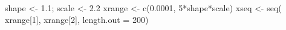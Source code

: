 \begin{Schunk}
\begin{Sinput}
  shape <- 1.1; scale <- 2.2
  xrange <- c(0.0001, 5*shape*scale)
  xseq <- seq( xrange[1], xrange[2], length.out = 200)
\end{Sinput}
\end{Schunk}

